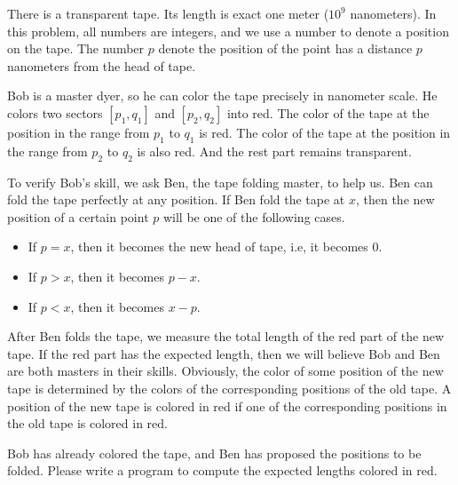 There is a transparent tape. Its length is exact one meter ($10^9$ nanometers).
In this problem, all numbers are integers, and we use a number to denote 
a position on the tape. The number $p$ denote the position of the point
has a distance $p$ nanometers from the head of tape.

Bob is a master dyer, so he can color the tape precisely in nanometer scale.
He colors two sectors $[p_1,q_1]$ and $[p_2,q_2]$ into red. 
The color of the tape at the position in the range from $p_1$ to
$q_1$ is red. 
The color of the tape at the position in the range from $p_2$ to $q_2$
is also red. And the rest part remains transparent. 

To verify Bob's skill, we ask Ben, the tape folding master, to help us.
Ben can fold the tape perfectly at any position. 
If Ben fold the tape at $x$, then the new position of a certain point $p$ 
will be one of the following cases.
\begin{itemize}
\tightlist
\item If $p=x$, then it becomes the new head of tape, i.e, it becomes $0$.
\item If $p>x$, then it becomes $p-x$.
\item If $p<x$, then it becomes $x-p$. 
\end{itemize}
After Ben folds the tape, we measure the total length of the red part of the
new tape. 
If the red part has the expected length, then we will believe Bob and Ben
are both masters in their skills.
Obviously, the color of some position of the new tape is determined by the 
colors of the corresponding positions of the old tape. 
A position of the new tape is colored in red if one of the corresponding 
positions in the old tape is colored in red. 

Bob has already colored the tape, and Ben has proposed the positions to be
folded. 
Please write a program to compute the expected lengths colored in red.
